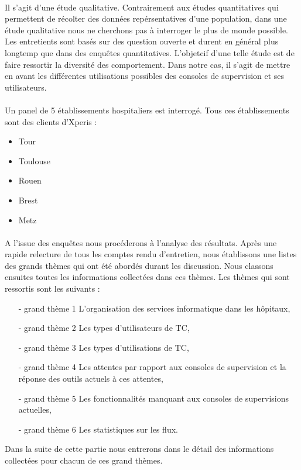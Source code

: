 			\paragraph{}%
			Il s'agit d'une étude qualitative. Contrairement aux études quantitatives qui
			permettent de récolter des données repérsentatives d'une population,
			dans une étude qualitative nous ne cherchons pas à interroger le plus de
			monde possible. Les entretients sont basés sur des question ouverte et durent
			en général plus longtemp que dans des enquêtes quantitatives. L'objetcif
			d'une telle étude est de faire ressortir la diversité des comportement. Dans
			notre cas, il s'agit de mettre en avant les différentes utilisations
			possibles des consoles de supervision et ses utilisateurs.
			
			\paragraph{}%
			Un panel de 5 établissements hospitaliers est interrogé. Tous ces
			établissements sont des clients d’Xperis :
			\begin{itemize}
			  \item Tour
			  \item Toulouse
			  \item Rouen
			  \item Brest
			  \item Metz
			\end{itemize}
			
			\paragraph{}%
			A l'issue des enquêtes nous procéderons à l'analyse des résultats. Après une
			rapide relecture de tous les comptes rendu d'entretien, nous établissons une
			listes des grands thèmes qui ont été abordés durant les discussion. Nous
			classons ensuites toutes les informations collectées dans ces thèmes.\newline
			Les thèmes qui sont ressortis sont les suivants :
			\begin{itemize}
			  \item[- grand thème 1] L’organisation des services informatique dans les
			  hôpitaux,
			  \item[- grand thème 2] Les types d’utilisateurs de TC,
			  \item[- grand thème 3] Les types d’utilisations de TC,
			  \item[- grand thème 4] Les attentes par rapport aux consoles de supervision
			  et la réponse des outils actuels à ces attentes,
			  \item[- grand thème 5] Les fonctionnalités manquant aux consoles de
			  supervisions actuelles,
			  \item[- grand thème 6] Les statistiques sur les flux.
			\end{itemize}
			Dans la suite de cette partie nous entrerons dans le détail des informations
			collectées pour chacun de ces grand thèmes.
			
